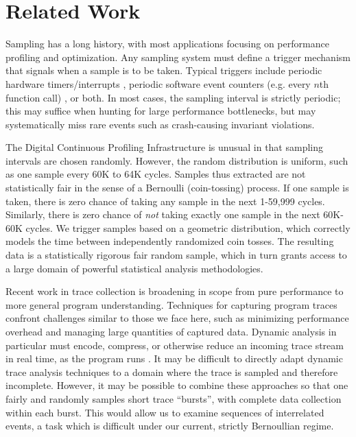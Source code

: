 \section{Related Work}
\label{sec:related-work}

Sampling has a long history, with most applications focusing on
performance profiling and optimization.  Any sampling system must
define a trigger mechanism that signals when a sample is to be taken.
Typical triggers include periodic hardware timers/interrupts
\cite{Burrows:2000:EFV,Traub:200:EILPP,Whaley:337483}, periodic
software event counters (e.g.  every $n$th function call)
\cite{Arnold:2000:ACCTS}, or both.  In most cases, the sampling
interval is strictly periodic; this may suffice when hunting for large
performance bottlenecks, but may systematically miss rare events such
as crash-causing invariant violations.

The Digital Continuous Profiling Infrastructure
\cite{Anderson:1997:CPW} is unusual in that sampling intervals are
chosen randomly.  However, the random distribution is uniform, such as
one sample every 60K to 64K cycles.  Samples thus extracted are not
statistically fair in the sense of a Bernoulli (coin-tossing) process.
If one sample is taken, there is zero chance of taking any sample in
the next 1-59,999 cycles.  Similarly, there is zero chance of
\emph{not} taking exactly one sample in the next 60K-60K cycles.  We
trigger samples based on a geometric distribution, which correctly
models the time between independently randomized coin tosses.  The
resulting data is a statistically rigorous fair random sample, which
in turn grants access to a large domain of powerful statistical
analysis methodologies.

Recent work in trace collection is broadening in scope from pure
performance to more general program understanding.  Techniques for
capturing program traces confront challenges similar to those we face
here, such as minimizing performance overhead and managing large
quantities of captured data.  Dynamic analysis in particular must
encode, compress, or otherwise reduce an incoming trace stream in real
time, as the program runs \cite{Demsky:RBEOOP:2002,ICSE01*221}.  It
may be difficult to directly adapt dynamic trace analysis techniques
to a domain where the trace is sampled and therefore incomplete.
However, it may be possible to combine these approaches so that one
fairly and randomly samples short trace ``bursts'', with complete data
collection within each burst.  This would allow us to examine
sequences of interrelated events, a task which is difficult under our
current, strictly Bernoullian regime.

